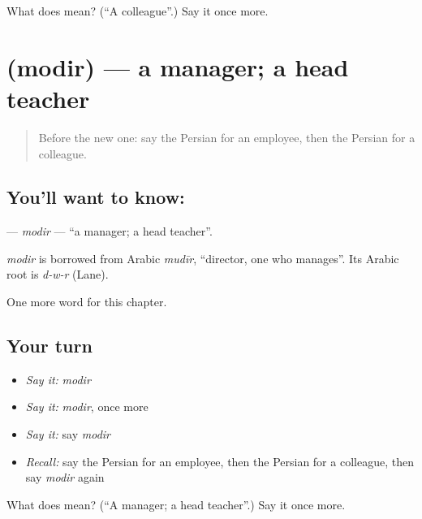 \begin{tcolorbox}[breakable,colback=teal!4,colframe=teal!35!black,title={Before you move on}]
What does  mean? (\textquotedblleft{}A colleague\textquotedblright{}.) Say it once more.
\end{tcolorbox}
\section[\texorpdfstring{\fa{مدیر} (modir)}{مدیر (modir)}]{ (modir) — a manager; a head teacher}

\label{lesson:FA-C214-modir}



\begin{quote}
Before the new one: say the Persian for an employee, then the Persian for a colleague.
\end{quote}

\subsection*{You'll want to know: }
\textbf{} — \emph{modir} — \textquotedblleft{}a manager; a head teacher\textquotedblright{}.

\begin{cousinweb}
\emph{modir} is borrowed from Arabic \emph{mudīr}, \textquotedblleft{}director, one who manages\textquotedblright{}. Its Arabic root is \emph{d-w-r} (Lane).
\end{cousinweb}

\begin{grammarlens}[title={What you've built}]
One more word for this chapter.
\end{grammarlens}

\subsection*{Your turn}
\begin{itemize}
\raggedright
  \item \emph{Say it:} \emph{modir}
  \item \emph{Say it:} \emph{modir}, once more
  \item \emph{Say it:} say \emph{modir}
  \item \emph{Recall:} say the Persian for an employee, then the Persian for a colleague, then say \emph{modir} again
\end{itemize}

\begin{tcolorbox}[breakable,colback=teal!4,colframe=teal!35!black,title={Before you move on}]
What does  mean? (\textquotedblleft{}A manager; a head teacher\textquotedblright{}.) Say it once more.
\end{tcolorbox}
